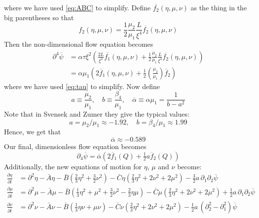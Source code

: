 \documentclass[reqno]{article}
\begin{document}
	where we have used \eqref{eq:ABC} to simplify. Define $\overline{f_2}(\eta, \mu, \nu)$ as the thing in the big parentheses so that
	\begin{equation}
		f_2(\eta, \mu, \nu) = \frac12 \frac{\mu_2}{\mu_1} \frac{L}{\xi^4} \overline{f_2}(\eta, \mu, \nu)
	\end{equation}
	Then the non-dimensional flow equation becomes
	\begin{equation}
	\begin{split}
		\partial^4 \overline{\psi}
		&= \alpha \tau \xi^2 \left(
		\frac{2L}{\xi^4} \overline{f_1}(\eta, \mu, \nu)
		+ \frac12 \frac{\mu_2}{\mu_1} \frac{L}{\xi^4} \overline{f_2}(\eta, \mu, \nu)
		\right) \\
		&= \alpha \mu_1 \left(
		2 \overline{f}_1 (\eta, \mu, \nu)
		+ \frac12 \left( \frac{\mu_2}{\mu_1} \right) \overline{f}_2
		\right)
	\end{split}
	\end{equation}
	where we have used \eqref{eq:tau} to simplify. Now define
	\begin{equation}
		a \equiv \frac{\mu_2}{\mu_1},
		\quad
		b \equiv \frac{\beta_4}{\mu_1},
		\quad
		\overline{\alpha} \equiv \alpha \mu_1
		= \frac{1}{b - a^2}
	\end{equation}
	Note that in Svensek and Zumer they give the typical values:
	\begin{equation}
		a = \mu_2/\mu_1 \approx -1.92,
		\quad b = \beta_4/\mu_1 \approx 1.99
	\end{equation}
	Hence, we get that
	\begin{equation}
		\overline{\alpha} \approx -0.589
	\end{equation}
	Our final, dimensionless flow equation becomes
	\begin{equation}
		\partial_4 \overline{\psi}
		= \overline{\alpha} \left(
		2 \overline{f}_1 (Q)
		+ \tfrac12 a \overline{f}_2 (Q)
		\right)
	\end{equation}
	Additionally, the new equations of motion for $\eta$, $\mu$ and $\nu$ become:
	\begin{equation}\label{eq:dimensionless-flow-eoms}
	\begin{split}
		\frac{\partial \eta}{\partial \bar{t}} &= \partial^2 \eta - \bar{A}\eta - \bar{B}\left( \tfrac 23 \eta^2 + \tfrac 32 \nu^2\right) - \bar{C} \eta \left( \tfrac23 \eta^2 + 2\nu^2 + 2\mu^2\right) - \tfrac32 a\,\partial_1 \partial_2 \overline{\psi} \\
		\frac{\partial \mu}{\partial \bar{t}} &= \partial^2 \mu - \bar{A}\mu - \bar{B}\left( \tfrac13 \eta^2 + \mu^2 + \tfrac32 \nu^2 - \tfrac23 \eta \mu \right) - \bar{C}\mu\left(\tfrac23 \eta^2 + 2\nu^2 + 2\mu^2\right) + \tfrac12 a\,\partial_1 \partial_2 \overline{\psi} \\
		\frac{\partial \nu}{\partial \bar{t}} &= \partial^2 \nu - \bar{A}\nu - \bar{B}\left( \tfrac13\eta\nu + \mu\nu \right) - \bar{C}\nu\left(\tfrac23\eta^2 + 2\nu^2 + 2\mu^2\right)
		- \tfrac12 a\, \left( \partial_2^2 - \partial_1^2 \right)
		\overline{\psi}
	\end{split}
	\end{equation}
	
\end{document}
